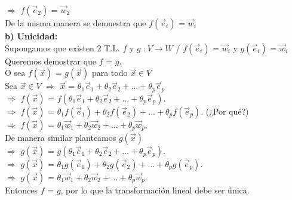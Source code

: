 \documentclass[11pt]{article}
\begin{document}
$\Rightarrow$ $f(\vec{e}_2)$ = $\vec{w}_2$ \\
De la misma manera se demuestra que $f(\vec{e}_i)$ = $\vec{w}_i$ \\
{\bfseries b) Unicidad:} \\
Supongamos que existen 2 T.L. $f$ y $g$ $: V \rightarrow W$ / $f(\vec{e}_i)$ = $\vec{w}_i$ y $g(\vec{e}_i)$ = $\vec{w}_i$ \\
Queremos demostrar que $f$ = $g$. \\
O sea $f(\vec{x})$ = $g(\vec{x})$ para todo $\vec{x} \in V$ \\
Sea $\vec{x} \in V$ $\Rightarrow$ $\vec{x}$ = $\theta_1 \vec{e}_1 + \theta_2 \vec{e}_2 + \hdots + \theta_p \vec{e}_p$ \\
$\Rightarrow$ $f(\vec{x})$ = $f(\theta_1 \vec{e}_1 + \theta_2 \vec{e}_2 + \hdots + \theta_p \vec{e}_p)$. \\
$\Rightarrow$ $f(\vec{x})$ = $\theta_1 f(\vec{e}_1) + \theta_2 f(\vec{e}_2) + \hdots + \theta_p f(\vec{e}_p)$. (¿Por qué?) \\
$\Rightarrow$ $f(\vec{x})$ = $\theta_1 \vec{w}_1 + \theta_2 \vec{w}_2 + \hdots + \theta_p \vec{w}_p$. \\
De manera similar planteamos $g(\vec{x})$\\
$\Rightarrow$ $g(\vec{x})$ = $g(\theta_1 \vec{e}_1 + \theta_2 \vec{e}_2 + \hdots + \theta_p \vec{e}_p)$. \\
$\Rightarrow$ $g(\vec{x})$ = $\theta_1 g(\vec{e}_1) + \theta_2 g(\vec{e}_2) + \hdots + \theta_p g(\vec{e}_p)$.  \\
$\Rightarrow$ $g(\vec{x})$ = $\theta_1 \vec{w}_1 + \theta_2 \vec{w}_2 + \hdots + \theta_p \vec{w}_p$. \\
Entonces $f$ = $g$, por lo que la transformación lineal debe ser única.
\end{document}
